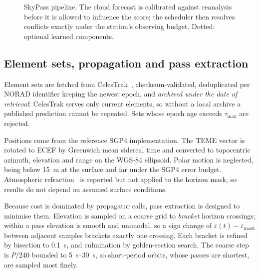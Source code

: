 \documentclass[conference]{IEEEtran}
\begin{document}
\begin{figure}[htbp]
\caption{SkyPass pipeline. The cloud forecast is calibrated against reanalysis
before it is allowed to influence the score; the scheduler then resolves
conflicts exactly under the station's observing budget. Dotted: optional learned
components.}
\label{fig:arch}
\end{figure}

\subsection{Element sets, propagation and pass extraction}
Element sets are fetched from CelesTrak~\cite{celestrak}, checksum-validated,
deduplicated per NORAD identifier keeping the newest epoch, and \emph{archived
under the date of retrieval}: CelesTrak serves only current elements, so without
a local archive a published prediction cannot be repeated. Sets whose epoch age
exceeds $\tau_\mathrm{max}$ are rejected.

Positions come from the reference SGP4 implementation. The TEME vector is
rotated to ECEF by Greenwich mean sidereal time and converted to topocentric
azimuth, elevation and range on the WGS-84 ellipsoid. Polar motion is neglected,
being below \SI{15}{\metre} at the surface and far under the SGP4 error budget.
Atmospheric refraction~\cite{stuhl2021refraction} is reported but not applied to
the horizon mask, so results do not depend on assumed surface conditions.

Because cost is dominated by propagator calls, pass extraction is designed to
minimise them. Elevation is sampled on a coarse
grid to \emph{bracket} horizon crossings; within a pass elevation is smooth and
unimodal, so a sign change of $\varepsilon(t) - \varepsilon_\mathrm{mask}$
between adjacent samples brackets exactly one crossing. Each bracket is refined
by bisection to \SI{0.1}{\second}, and culmination by golden-section search. The
coarse step is $P/240$ bounded to \SIrange{5}{30}{\second}, so short-period
orbits, whose passes are shortest, are sampled most finely.
\end{document}
